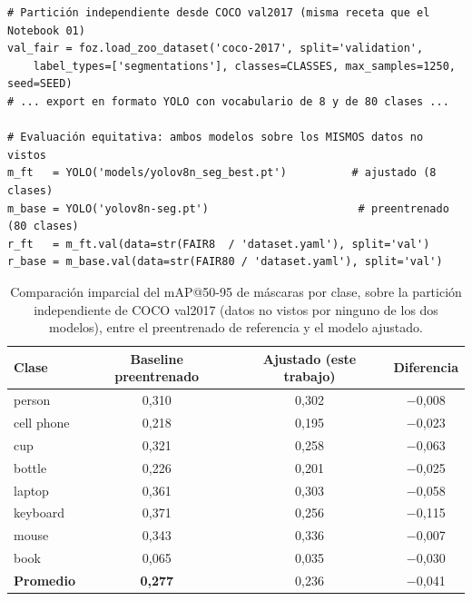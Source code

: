 \documentclass[11pt,a4paper]{article}
\begin{document}
\begin{lstlisting}[style=py,caption={Construcción de una partición de prueba
imparcial desde COCO val2017 (no vista por ninguno de los dos modelos) y
evaluación equitativa del ajustado y del preentrenado sobre ella.},
label={lst:baseline}]
# Partición independiente desde COCO val2017 (misma receta que el Notebook 01)
val_fair = foz.load_zoo_dataset('coco-2017', split='validation',
    label_types=['segmentations'], classes=CLASSES, max_samples=1250, seed=SEED)
# ... export en formato YOLO con vocabulario de 8 y de 80 clases ...

# Evaluación equitativa: ambos modelos sobre los MISMOS datos no vistos
m_ft   = YOLO('models/yolov8n_seg_best.pt')          # ajustado (8 clases)
m_base = YOLO('yolov8n-seg.pt')                       # preentrenado (80 clases)
r_ft   = m_ft.val(data=str(FAIR8  / 'dataset.yaml'), split='val')
r_base = m_base.val(data=str(FAIR80 / 'dataset.yaml'), split='val')
\end{lstlisting}

\begin{table}[H]
  \centering
  \small
  \caption{Comparación imparcial del mAP@50-95 de máscaras por clase, sobre la
  partición independiente de COCO val2017 (datos no vistos por ninguno de los
  dos modelos), entre el preentrenado de referencia y el modelo ajustado.}
  \label{tab:baseline}
  \begin{tabular}{@{}lccc@{}}
    \toprule
    \textbf{Clase} & \textbf{Baseline preentrenado} & \textbf{Ajustado (este trabajo)} & \textbf{Diferencia} \\
    \midrule
    person     & 0,310 & 0,302 & $-$0,008 \\
    cell phone & 0,218 & 0,195 & $-$0,023 \\
    cup        & 0,321 & 0,258 & $-$0,063 \\
    bottle     & 0,226 & 0,201 & $-$0,025 \\
    laptop     & 0,361 & 0,303 & $-$0,058 \\
    keyboard   & 0,371 & 0,256 & $-$0,115 \\
    mouse      & 0,343 & 0,336 & $-$0,007 \\
    book       & 0,065 & 0,035 & $-$0,030 \\
    \midrule
    \textbf{Promedio} & \textbf{0,277} & 0,236 & $-$0,041 \\
    \bottomrule
  \end{tabular}
\end{table}
\end{document}
